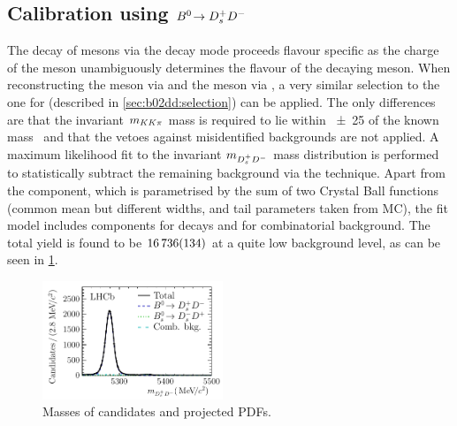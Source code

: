 
\subsection[Calibration using \texorpdfstring{$\BdToDsD$}{Bd2DsD}]{Calibration using \texorpdfstring{$\BdToDsD$}{Bd2DsD}}
\label{sec:dataanalysis:taggingcalibration:dsdcalibration}

The decay of \Bd mesons via the decay mode \BdToDsD proceeds flavour specific
as the charge of the \Dsp meson unambiguously determines the flavour of the
decaying \Bd meson. When reconstructing the \Dsp meson via \DspToKKpi and the
\Dp meson via \DpToKpipi, a very similar selection to the one for \BdToDD
(described in \cref{sec:b02dd:selection}) can be applied. The only differences
are that the invariant $m_{KK\pi}$ mass is required to lie within
\SI{\pm25}{\MeVcc} of the known \Dsp mass~\cite{PDG2014} and that the vetoes
against misidentified backgrounds are not applied. A maximum likelihood fit to
the invariant $m_{{{D}^+_{s}}{{D}^-}}$ mass distribution is performed to statistically
subtract the remaining background via the \sPlot technique. Apart from the
\BdToDsD component, which is parametrised by the sum of two Crystal Ball
functions (common mean but different widths, and tail parameters taken from
MC), the fit model includes components for \BsToDsD decays and for
combinatorial background. The total \BdToDsD yield is found to be
$\num{16736\pm134}$ at a quite low background level, as can be seen in
\cref{fig:dataanalysis:taggingcalibration:dsdcalibration:mass}.

\begin{figure}[htb]
\centering
\includegraphics[width=0.48\textwidth]{05-DataAnalysis/tikz/pdf/DsD_MassFit.pdf}
\caption{Masses of \BdToDsD candidates and projected PDFs.}
\label{fig:dataanalysis:taggingcalibration:dsdcalibration:mass}
\end{figure}

